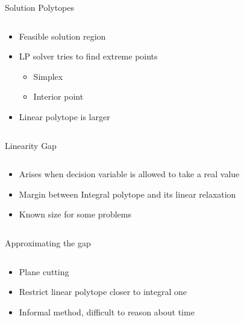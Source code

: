 \documentclass{beamer}
\begin{document}
\begin{frame}{Solution Polytopes}
\begin{columns}
\begin{column}{6cm}
\begin{itemize}
	\item Feasible solution region
	\item LP solver tries to find extreme points
	\begin{itemize}
		\item Simplex
		\item Interior point
	\end{itemize}
	\item Linear polytope is larger
\end{itemize}
\end{column}
\begin{column}{4cm}
\end{column}
\end{columns}
\end{frame}

\begin{frame}{Linearity Gap}
\begin{columns}
\begin{column}{6cm}
\begin{itemize}
	\item Arises when decision variable is allowed to take a real value
	\item Margin between Integral polytope and its linear relaxation
	\item Known size for some problems
\end{itemize}
\end{column}
\begin{column}{4cm}
\end{column}
\end{columns}
\end{frame}

\begin{frame}{Approximating the gap}
\begin{columns}
\begin{column}{6cm}
\begin{itemize}
	\item Plane cutting
	\item Restrict linear polytope closer to integral one
	\item Informal method, difficult to reason about time
\end{itemize}
\end{column}
\begin{column}{4cm}
\end{column}
\end{columns}
\end{frame}
\end{document}
